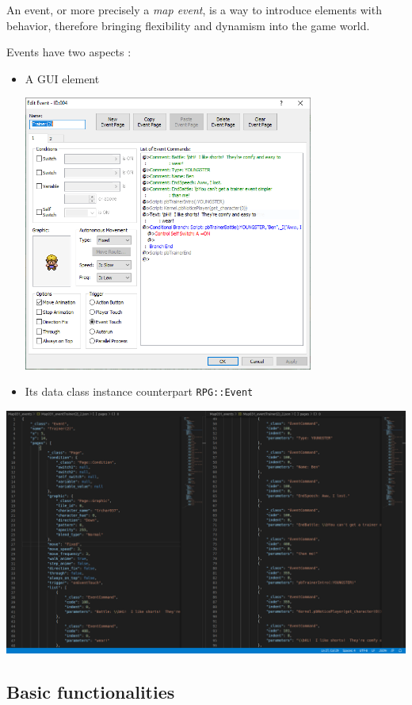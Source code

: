 \documentclass[11pt]{article}
\begin{document}
An event, or more precisely a \textit{map event}, is a way to introduce elements with behavior, therefore bringing flexibility and dynamism into the game world.

Events have two aspects :
\begin{itemize}
	\item A GUI element
	\vspace{2mm}
	\begin{center}
		\includegraphics[width=0.75\textwidth]{Event} 
	\end{center}
	\newpage
	\item Its data class instance counterpart \verb|RPG::Event|
	
	
\end{itemize}
\includegraphics[width=\textwidth]{Event_json}


\subsection{Basic functionalities}
\end{document}
